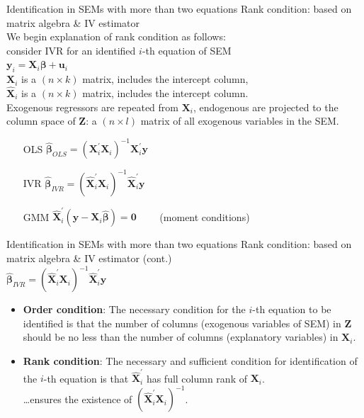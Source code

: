 \documentclass[usenames,dvipsnames]{beamer}
\begin{document}
\begin{frame}{Identification in SEMs with more than two equations}
Rank condition: based on matrix algebra \& IV estimator\\
\medskip
We begin explanation of rank condition as follows:\\
\smallskip
consider IVR for an identified $i$-th equation of SEM\\
\medskip
$\bm{y}_i = \bm{X}_i \bm{\beta} + \bm{u}_i$\\
\medskip
$\bm{X}_i$ is a $(n\! \times \! k)$ matrix, includes the intercept column,\\
\medskip
$\hat{\bm{X}}_i$ is a $(n\! \times \! k)$ matrix, includes the intercept column.\\
Exogenous regressors are repeated from $\bm{X}_i$, endogenous are projected to the column space of $\bm{Z}$: a $(n\! \times \! l)$ matrix of all exogenous variables in the SEM.\\
\bigskip
\begin{itemize}
\item[OLS] $\hat{\bm\beta}_{\textit{OLS}}=
\left(\bm{X}^{\prime}_i \bm{X}_i \right)^{-1}\! \bm{X}^{\prime}_i \bm{y}$\\
\medskip
\item[IVR] $\hat{\bm\beta}_{\textit{IVR}}=
\left(\hat{\bm{X}}^{\prime}_i \bm{X}_i \right)^{-1}\! \hat{\bm{X}}^{\prime}_i \bm{y}$\\
\medskip
\item[GMM] $\hat{\bm{X}}^{\prime}_i \! \left( \bm{y} - \bm{X}_i \hat{\bm{\beta}} \right) = \bm{0} \qquad$ (moment conditions)
\end{itemize}
\end{frame}
\begin{frame}{Identification in SEMs with more than two equations}
Rank condition: based on matrix algebra \& IV estimator (cont.)\\
\medskip
$\hat{\bm\beta}_{\textit{IVR}}=
\left(\hat{\bm{X}}^{\prime}_i \bm{X}_i \right)^{-1}\! \hat{\bm{X}}^{\prime}_i \bm{y}$\\
\bigskip
\begin{itemize}
\item \textbf{Order condition}: The necessary condition for the $i$-th equation to be identified is that the number of columns (exogenous variables of SEM) in $\bm{Z}$ should be no less than the number of columns (explanatory variables) in $\bm{X}_i$.\\
\medskip
\item \textbf{Rank condition}: The necessary and sufficient condition for identification of the $i$-th equation is that $\hat{\bm{X}}^{\prime}_i$ has full column rank of $\bm{X}_i$.\\
\dots ensures the existence of $\left(\hat{\bm{X}}^{\prime}_i \bm{X}_i \right)^{-1}$.
\end{itemize}
\end{frame}
\end{document}
